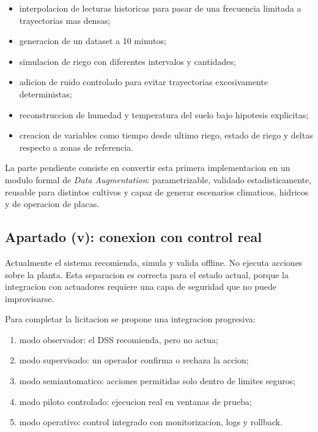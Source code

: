 ﻿\documentclass[11pt,a4paper]{article}
\begin{document}
\begin{itemize}
    \item interpolacion de lecturas historicas para pasar de una frecuencia limitada a trayectorias mas densas;
    \item generacion de un dataset a 10 minutos;
    \item simulacion de riego con diferentes intervalos y cantidades;
    \item adicion de ruido controlado para evitar trayectorias excesivamente deterministas;
    \item reconstruccion de humedad y temperatura del suelo bajo hipotesis explicitas;
    \item creacion de variables como tiempo desde ultimo riego, estado de riego y deltas respecto a zonas de referencia.
\end{itemize}

La parte pendiente consiste en convertir esta primera implementacion en un modulo formal de \textit{Data Augmentation}: parametrizable, validado estadisticamente, reusable para distintos cultivos y capaz de generar escenarios climaticos, hidricos y de operacion de placas.

\subsection{Apartado (v): conexion con control real}

Actualmente el sistema recomienda, simula y valida offline. No ejecuta acciones sobre la planta. Esta separacion es correcta para el estado actual, porque la integracion con actuadores requiere una capa de seguridad que no puede improvisarse.

Para completar la licitacion se propone una integracion progresiva:

\begin{enumerate}
    \item modo observador: el DSS recomienda, pero no actua;
    \item modo supervisado: un operador confirma o rechaza la accion;
    \item modo semiautomatico: acciones permitidas solo dentro de limites seguros;
    \item modo piloto controlado: ejecucion real en ventanas de prueba;
    \item modo operativo: control integrado con monitorizacion, logs y rollback.
\end{enumerate}
\end{document}
